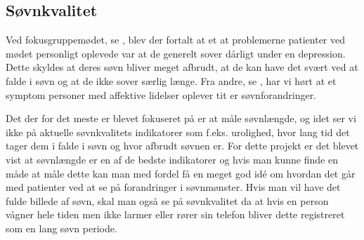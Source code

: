 \subsection{Søvnkvalitet}
Ved fokusgruppemødet, se \citep[Kapitel 1, Sektion 5]{misc:faellesrapp}, blev der fortalt at et at problemerne patienter ved mødet personligt oplevede var at de generelt sover dårligt under en depression.
Dette skyldes at deres søvn bliver meget afbrudt, at de kan have det svært ved at falde i søvn og at de ikke sover særlig længe.
Fra andre, se \citep[Kapitel 1, Sektion 3 og 4]{misc:faellesrapp}, har vi hørt at et symptom personer med affektive lidelser oplever tit er søvnforandringer. 

Det der for det meste er blevet fokuseret på er at måle søvnlængde, og idet ser vi ikke på aktuelle søvnkvalitets indikatorer som f.eks. urolighed, hvor lang tid det tager dem i falde i søvn og hvor afbrudt søvnen er.
For dette projekt er det blevet vist at søvnlængde er en af de bedste indikatorer og hvis man kunne finde en måde at måle dette kan man med fordel få en meget god idé om hvordan det går med patienter ved at se på forandringer i søvnmønster. 
Hvis man vil have det fulde billede af søvn, skal man også se på søvnkvalitet da at hvis en person vågner hele tiden men ikke larmer eller rører sin telefon bliver dette registreret som en lang søvn periode.